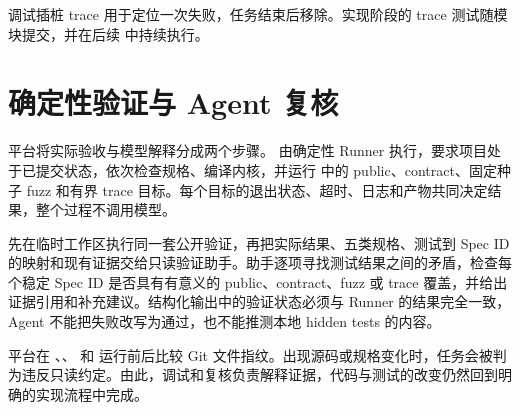 调试插桩 trace 用于定位一次失败，任务结束后移除。实现阶段的 trace 测试随模块提交，并在后续  中持续执行。

\section{确定性验证与 Agent 复核}

平台将实际验收与模型解释分成两个步骤。 由确定性 Runner 执行，要求项目处于已提交状态，依次检查规格、编译内核，并运行  中的 public、contract、固定种子 fuzz 和有界 trace 目标。每个目标的退出状态、超时、日志和产物共同决定结果，整个过程不调用模型。

 先在临时工作区执行同一套公开验证，再把实际结果、五类规格、测试到 Spec ID 的映射和现有证据交给只读验证助手。助手逐项寻找测试结果之间的矛盾，检查每个稳定 Spec ID 是否具有有意义的 public、contract、fuzz 或 trace 覆盖，并给出证据引用和补充建议。结构化输出中的验证状态必须与 Runner 的结果完全一致，Agent 不能把失败改写为通过，也不能推测本地 hidden tests 的内容。

平台在 、、 和  运行前后比较 Git 文件指纹。出现源码或规格变化时，任务会被判为违反只读约定。由此，调试和复核负责解释证据，代码与测试的改变仍然回到明确的实现流程中完成。
